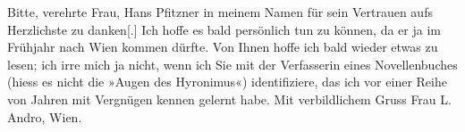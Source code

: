 \pstart
           Bitte, verehrte Frau, Hans Pfitzner in meinem
               Namen für sein Vertrauen aufs Herzlichste zu danken{[}.{]} Ich hoffe
               es bald persönlich tun zu können, da er ja im Frühjahr nach Wien kommen dürfte. Von Ihnen hoffe ich bald wieder etwas zu
               lesen; ich irre mich ja nicht, wenn ich Sie mit der Verfasserin eines Novellenbuches
               (hiess es nicht die »Augen des Hyronimus«) identifiziere, das ich vor einer Reihe von Jahren mit
               Vergnügen kennen gelernt habe.\pend
           \pstart Mit verbildlichem Gruss\pend{}{\vspace{1\baselineskip}}
\pstart
           \noindent{}Frau L. Andro, Wien.\pend
           \endnumbering{}  
      